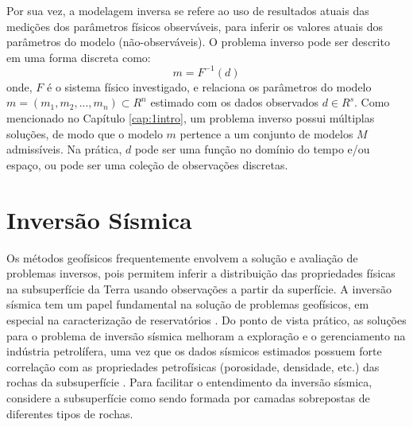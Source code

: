 Por sua vez, a modelagem inversa se refere ao uso de resultados atuais das medições dos parâmetros
físicos observáveis, para inferir os valores atuais dos parâmetros do modelo (não-observáveis).
O problema inverso pode ser descrito em uma forma discreta como:
\begin{equation}
\label{eq:deqgm}
m = F^{-1}(d)
\end{equation}
onde, $F$ é o sistema físico investigado, e relaciona os parâmetros do modelo $m=(m_1, m_2,...,m_n) \subset R^n$
estimado com os dados observados $d \in R^s$.
Como mencionado no Capítulo \ref{cap:1intro}, um problema inverso possui múltiplas soluções,
de modo que o modelo $m$ pertence a um conjunto de modelos $M$ admissíveis.
Na prática, $d$ pode ser uma função no domínio do tempo e/ou espaço, ou pode ser
uma coleção de observações discretas.

\section{Inversão Sísmica}
Os métodos geofísicos frequentemente envolvem a solução e avaliação de problemas inversos,
pois permitem inferir a distribuição das propriedades físicas na subsuperfície da Terra
usando observações a partir da superfície. A inversão sísmica tem um papel fundamental na solução 
de problemas geofísicos, em especial na caracterização de reservatórios \citep{Bosch2010,Srivastava2009}.
Do ponto de vista prático, as soluções para o problema de inversão sísmica melhoram a exploração e
o gerenciamento na indústria petrolífera, uma vez que os dados sísmicos estimados possuem forte correlação com as
propriedades petrofísicas (porosidade, densidade, etc.) das rochas da subsuperfície \citep{leandroGRSL}.
Para facilitar o entendimento da inversão sísmica, considere a subsuperfície como sendo formada por camadas
sobrepostas de diferentes tipos de rochas.

